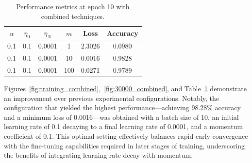 \begin{table}
    \centering
    \begin{tabular}{|c|c|c|c|c|c|}
        \hline
        \textbf{\(\alpha\)} & \textbf{\(\eta_0\)} & \textbf{\(\eta_N\)} & \textbf{\(m\)} & \textbf{Loss} & \textbf{Accuracy} \\
        \hline
        0.1 & 0.1  & 0.0001   & 1 & 2.3026  & 0.0980 \\
        0.1 & 0.1  & 0.0001  & 10 & 0.0016  & 0.9828 \\
        0.1 & 0.1  & 0.0001 & 100 & 0.0271  & 0.9789 \\
        \hline
    \end{tabular}
    \caption{Performance metrics at epoch 10 with combined techniques.}
    \label{tab:combination}
\end{table}

Figures~\ref{fig:training_combined},~\ref{fig:30000_combined}, and Table~\ref{tab:combination} demonstrate an improvement over previous experimental configurations. Notably, the configuration that yielded the highest performance—achieving 98.28\% accuracy and a minimum loss of 0.0016—was obtained with a batch size of 10, an initial learning rate of 0.1 decaying to a final learning rate of 0.0001, and a momentum coefficient of 0.1. This optimal setting effectively balances rapid early convergence with the fine-tuning capabilities required in later stages of training, underscoring the benefits of integrating learning rate decay with momentum.